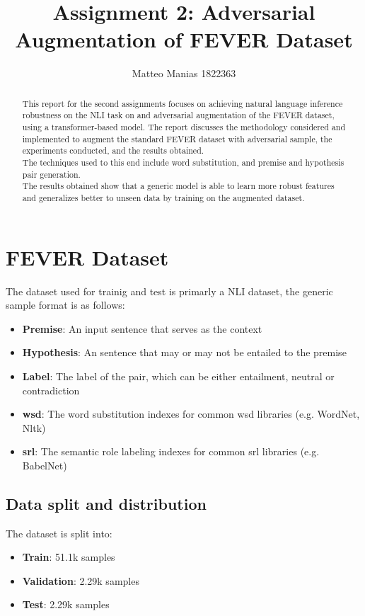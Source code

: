 \documentclass[11pt,a4paper]{article}
\title{Assignment 2: Adversarial Augmentation of FEVER Dataset}
\author{Matteo Manias 1822363}
\date{}
\begin{document}
\maketitle
\begin{abstract}
This report for the second assignments focuses on achieving natural language inference robustness on the NLI task on and 
adversarial augmentation of the FEVER dataset, using a transformer-based model. The report discusses the methodology considered and 
implemented to augment the standard FEVER dataset with adversarial sample, the experiments conducted, and the results obtained.
\\The techniques used to this end include word substitution, and premise and hypothesis pair generation.
\\The results obtained show that a generic model is able to learn more robust features and generalizes better to unseen data
by training on the augmented dataset.
\end{abstract}

\section{FEVER Dataset}
The dataset used for trainig and test is primarly a NLI dataset, the generic sample format is as follows:
\begin{itemize}
    \item \textbf{Premise}: An input sentence that serves as the context
    \item \textbf{Hypothesis}: An sentence that may or may not be entailed to the premise
    \item \textbf{Label}: The label of the pair, which can be either entailment, neutral or contradiction
    \item \textbf{wsd}: The word substitution indexes for common wsd libraries (e.g. WordNet, Nltk)
    \item \textbf{srl}: The semantic role labeling indexes for common srl libraries (e.g. BabelNet)
\end{itemize}
\subsection{Data split and distribution}
The dataset is split into:
\begin{itemize}
    \item \textbf{Train}: 51.1k samples
    \item \textbf{Validation}: 2.29k samples
    \item \textbf{Test}: 2.29k samples
\end{itemize}
\end{document}
